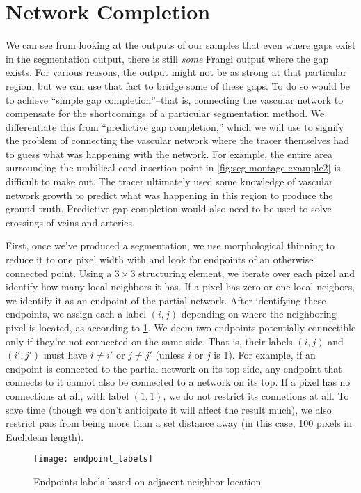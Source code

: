\section{Network Completion}
We can see from looking at the \Vmax outputs of our samples that even where gaps exist in the segmentation output, there is still \textit{some} Frangi output where the gap exists. For various reasons, the output might not be as strong at that particular region, but we can use that fact to bridge some of these gaps. To do so would be to achieve ``simple gap completion''--that is, connecting the vascular network to compensate for the shortcomings of a particular segmentation method. We differentiate this from ``predictive gap completion,'' which we will use to signify the problem of connecting the vascular network where the tracer themselves had to guess what was happening with the network. For example, the entire area surrounding the umbilical cord insertion point in \cref{fig:seg-montage-example2} is difficult to make out. The tracer ultimately used some knowledge of vascular network growth to predict what was happening in this region to produce the ground truth. Predictive gap completion would also need to be used to solve crossings of veins and arteries.

First, once we've produced a segmentation, we use morphological thinning to reduce it to one pixel width with \cite{thinning} and look for endpoints of an otherwise connected point. Using a $3\times 3$ structuring element, we iterate over each pixel and identify how many local neighbors it has. If a pixel has zero or one local neigbors, we identify it as an endpoint of the partial network. After identifying these endpoints, we assign each a label $(i,j)$ depending on where the neighboring pixel is located, as according to \cref{fig:endpoint_labels}. We deem two endpoints potentially connectible only if they're not connected on the same side. That is, their labels $(i,j)$ and $(i',j')$ must have $i\ne i'$ or $j\ne j'$ (unless $i$ or $j$ is 1). For example, if an endpoint is connected to the partial network on its top side, any endpoint that connects to it cannot also be connected to a network on its top. If a pixel has no connections at all, with label $(1,1)$, we do not restrict its connetions at all. To save time (though we don't anticipate it will affect the result much), we also restrict pais from being more than a set distance away (in this case, 100 pixels in Euclidean length).

\begin{figure}
	\centering
	\texttt{[image: endpoint\_labels]}
	\caption{Endpoints labels based on adjacent neighbor location}
	\label{fig:endpoint_labels}
\end{figure}

